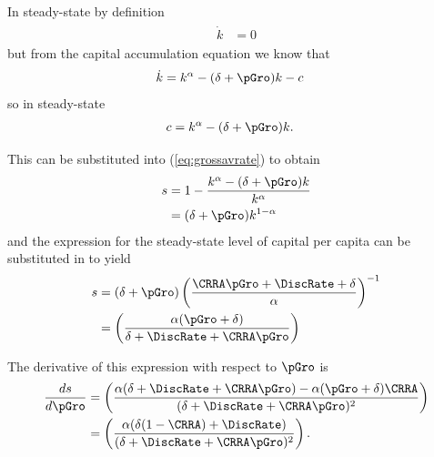 \documentclass{handout}
\begin{document}
In steady-state by definition
\begin{equation}\begin{gathered}\begin{aligned}
        \dot{k} & =  0 \label{eq:kdotOk} 
\end{aligned}\end{gathered}\end{equation}
but from the capital accumulation equation we know that
\begin{equation}\begin{gathered}\begin{aligned}
        \dot{k} & =  k^{\alpha}-(\delta+\pGro)k - c \label{eq:dotk}
\end{aligned}\end{gathered}\end{equation}
so in steady-state
\begin{equation}\begin{gathered}\begin{aligned}
        c & =  k^{\alpha}-(\delta+\pGro)k.
\end{aligned}\end{gathered}\end{equation}

This can be substituted into (\ref{eq:grossavrate}) to obtain
\begin{equation}\begin{gathered}\begin{aligned}
        s & =  1-\frac{k^{\alpha}-(\delta+\pGro)k}{k^{\alpha}}  \\
         & =  (\delta+\pGro)k^{1-\alpha}
\end{aligned}\end{gathered}\end{equation}
and the expression for the steady-state level of capital per capita
can be substituted in to yield
\begin{equation}\begin{gathered}\begin{aligned}
        s & =  (\delta+\pGro)\left(\frac{\CRRA \pGro+ \DiscRate + \delta}{\alpha}\right)^{-1}  
\\ & =  \left(\frac{\alpha(\pGro+\delta)}{\delta+\DiscRate+\CRRA \pGro}\right)     
\end{aligned}\end{gathered}\end{equation}
\clearpage

The derivative of this expression with respect to $\pGro$ is
\begin{equation}\begin{gathered}\begin{aligned}
        \frac{ds}{d\pGro} & =  \left(\frac{\alpha(\delta + \DiscRate + \CRRA \pGro)-\alpha 
(\pGro+\delta) \CRRA}{(\delta+\DiscRate+\CRRA \pGro)^{2}}\right)
\\ & =  \left(\frac{\alpha(\delta(1-\CRRA) + \DiscRate)}{(\delta+\DiscRate+\CRRA 
\pGro)^{2}}\right)
.
\end{aligned}\end{gathered}\end{equation}
\end{document}

